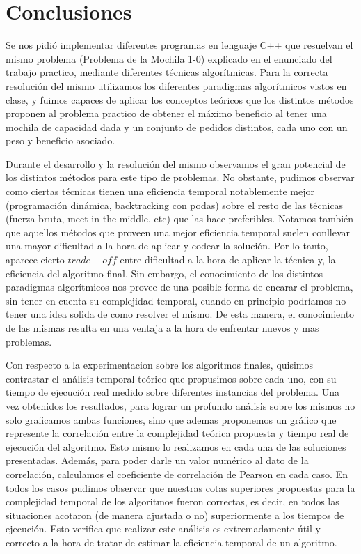 \section{Conclusiones}
\label{sec:conclusiones}

Se nos pidió implementar diferentes programas en lenguaje C++ que resuelvan el mismo problema (Problema de la Mochila 1-0) explicado en el enunciado del trabajo practico, mediante diferentes técnicas algorítmicas.
Para la correcta resolución del mismo utilizamos los diferentes paradigmas algorítmicos vistos en clase, y fuimos capaces de aplicar los conceptos teóricos que los distintos métodos proponen al problema practico de obtener el máximo beneficio al tener una mochila de capacidad dada y un conjunto de pedidos distintos, cada uno con un peso y beneficio asociado.


Durante el desarrollo y la resolución del mismo observamos el gran potencial de los distintos métodos para este tipo de problemas. No obstante, pudimos observar como ciertas técnicas tienen una eficiencia temporal notablemente mejor (programación dinámica, backtracking con podas) sobre el resto de las técnicas (fuerza bruta, meet in the middle, etc) que las hace preferibles. Notamos también que aquellos métodos que proveen una mejor eficiencia temporal suelen conllevar una mayor dificultad a la hora de aplicar y codear la solución. Por lo tanto, aparece cierto $trade-off$ entre dificultad a la hora de aplicar la técnica y, la eficiencia del algoritmo final.
Sin embargo, el conocimiento de los distintos paradigmas algorítmicos nos provee de una posible forma de encarar el problema, sin tener en cuenta su complejidad temporal, cuando en principio podríamos no tener una idea solida de como resolver el mismo. De esta manera, el conocimiento de las mismas resulta en una ventaja a la hora de enfrentar nuevos y mas problemas.


Con respecto a la experimentacion sobre los algoritmos finales, quisimos contrastar el análisis temporal teórico que propusimos sobre cada uno, con su tiempo de ejecución real medido sobre diferentes instancias del problema.
Una vez obtenidos los resultados, para lograr un profundo análisis sobre los mismos no solo graficamos ambas funciones, sino que ademas proponemos un gráfico que represente la correlación entre la complejidad teórica propuesta y tiempo real de ejecución del algoritmo. Esto mismo lo realizamos en cada una de las soluciones presentadas. Además, para poder darle un valor numérico al dato de la correlación, calculamos el coeficiente de correlación de Pearson en cada caso.
En todos los casos pudimos observar que nuestras cotas superiores propuestas para la complejidad temporal de los algoritmos fueron correctas, es decir, en todos las situaciones acotaron (de manera ajustada o no) superiormente a los tiempos de ejecución. Esto verifica que realizar este análisis es extremadamente útil y correcto a la hora de tratar de estimar la eficiencia temporal de un algoritmo.


